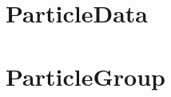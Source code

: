 \documentclass[ twoside,openright,titlepage,numbers=noenddot,%
headinclude,footinclude,cleardoublepage=empty,abstract=on,
BCOR=5mm,paper=a4,fontsize=11pt, dvipsnames
]{scrreprt}
\begin{document}
\section{ParticleData}
\section{ParticleGroup} 



%

%
\end{document}
